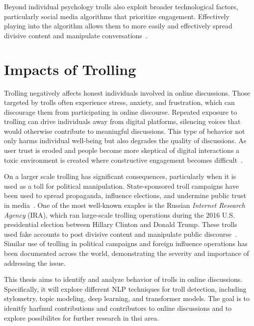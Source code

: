 \documentclass[twoside]{ctuthesis}
\theoremstyle{plain}
\theoremstyle{definition}
\theoremstyle{note}
\begin{document}
Beyond individual psychology trolls also exploit broader technological factors, particularly social media algorithms that prioritize engagement. Effectively playing into the algorithm allows them to more easily and effectively spread divisive content and manipulate conversations~\cite{GolfPapez2017DontFeedTheTroll}.

\section{Impacts of Trolling}
Trolling negatively affects honest individuals involved in online discussions. Those targeted by trolls often experience stress, anxiety, and frustration, which can discourage them from participating in online discourse. Repeated exposure to trolling can drive individuals away from digital platforms, silencing voices that would otherwise contribute to meaningful discussions. This type of behavior not only harms individual well-being but also degrades the quality of discussions. As user trust is eroded and people become more skeptical of digital interactions a toxic environment is created where constructive engagement becomes difficult~\cite{GolfPapez2017DontFeedTheTroll}.\par

On a larger scale trolling has significant consequences, particularly when it is used as a toll for political manipulation. State-sponsored troll campaigns have been used to spread propaganda, influence elections, and undermine public trust in media~\cite{Bradshaw2017TroopsTrolls}. One of the most well-known exaples is the Russian \textit{Internet Research Agency} (IRA), which ran large-scale trolling operations during the 2016 U.S. presidential election between Hillary Clinton and Donald Trump. These trolls used fake accounts to post divisive content and manipulate public discourse~\cite{Linvill2020IRATrolls}. Similar use of trolling in political campaigns and foreign influence operations has been documented across the world, demonstrating the severity and importance of addressing the issue.\par

This thesis aims to identify and analyze behavior of trolls in online discussions. Specifically, it will explore different NLP techniques for troll detection, including stylometry, topic modeling, deep learning, and transformer models. The goal is to idenitfy harfmul contributions and contributors to online discussions and to explore possibilites for further research in thsi area.\par
\end{document}
